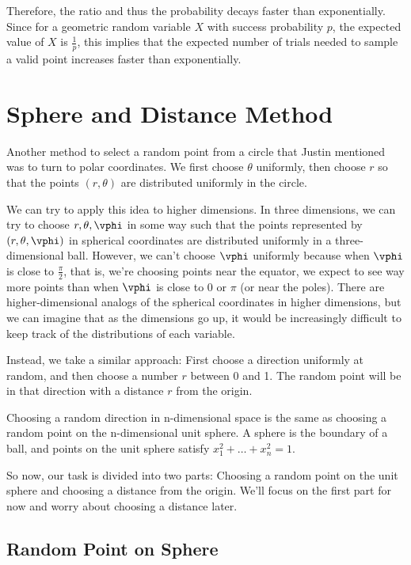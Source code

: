 \documentclass{article}
\begin{document}
Therefore, the ratio and thus the probability decays faster than exponentially. Since for a geometric random variable $X$ with success probability $p$, the expected value of $X$ is $\frac{1}{p}$, this implies that the expected number of trials needed to sample a valid point increases faster than exponentially.

\section{Sphere and Distance Method}

Another method to select a random point from a circle that Justin mentioned was to turn to polar coordinates. We first choose $\theta$ uniformly, then choose $r$ so that the points $(r, \theta)$ are distributed uniformly in the circle.

We can try to apply this idea to higher dimensions. In three dimensions, we can try to choose $r, \theta, \vphi$ in some way such that the points represented by $(r, \theta, \vphi)$ in spherical coordinates are distributed uniformly in a three-dimensional ball. However, we can't choose $\vphi$ uniformly because when $\vphi$ is close to $\frac{\pi}{2}$, that is, we're choosing points near the equator, we expect to see way more points than when $\vphi$ is close to 0 or $\pi$ (or near the poles). There are higher-dimensional analogs of the spherical coordinates in higher dimensions, but we can imagine that as the dimensions go up, it would be increasingly difficult to keep track of the distributions of each variable.

Instead, we take a similar approach: First choose a direction uniformly at random, and then choose a number $r$ between 0 and 1. The random point will be in that direction with a distance $r$ from the origin.

Choosing a random direction in n-dimensional space is the same as choosing a random point on the n-dimensional unit sphere. A sphere is the boundary of a ball, and points on the unit sphere satisfy $x_1^2 + \ldots + x_n^2 = 1$.

So now, our task is divided into two parts: Choosing a random point on the unit sphere and choosing a distance from the origin. We'll focus on the first part for now and worry about choosing a distance later.

\subsection{Random Point on Sphere}
\end{document}
